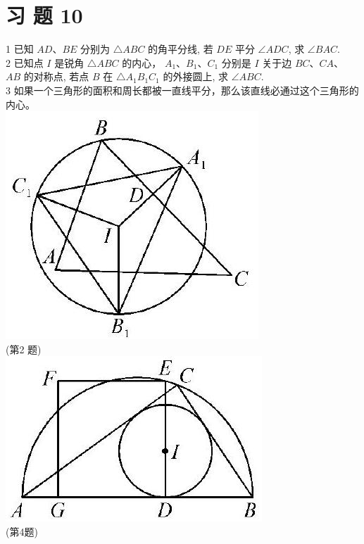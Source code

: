 \documentclass[10pt]{article}
\begin{document}
\section*{习 题 10}
1 已知 $A D 、 B E$ 分别为 $\triangle A B C$ 的角平分线, 若 $D E$ 平分 $\angle A D C$, 求 $\angle B A C$.\\
2 已知点 $I$ 是锐角 $\triangle A B C$ 的内心， $A_{1} 、 B_{1} 、 C_{1}$ 分别是 $I$ 关于边 $B C 、 C A 、$ $A B$ 的对称点, 若点 $B$ 在 $\triangle A_{1} B_{1} C_{1}$ 的外接圆上, 求 $\angle A B C$.\\
3 如果一个三角形的面积和周长都被一直线平分，那么该直线必通过这个三角形的内心。\\
\includegraphics[max width=\textwidth, center]{2024_10_30_66b8e5e701da2093c133g-077(1)}\\
(第2 题)\\
\includegraphics[max width=\textwidth, center]{2024_10_30_66b8e5e701da2093c133g-077}\\
(第4题)
\end{document}

